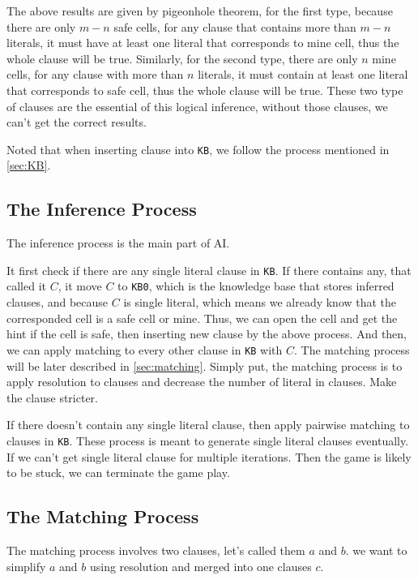 \documentclass[twocolumn]{extarticle}
\begin{document}
The above results are given by pigeonhole theorem, for the first type, because there are only $m-n$ safe cells, for any clause that contains more than $m-n$ literals, it must have at least one literal that corresponds to mine cell, thus the whole clause will be true. Similarly, for the second type, there are only $n$ mine cells, for any clause with more than $n$ literals, it must contain at least one literal that corresponds to safe cell, thus the whole clause will be true. These two type of clauses are the essential of this logical inference, without those clauses, we can't get the correct results.

Noted that when inserting clause into \texttt{KB}, we follow the process mentioned in \autoref{sec:KB}.

\subsection{The Inference Process}

The inference process is the main part of AI. 

It first check if there are any single literal clause in \texttt{KB}. If there contains any, that called it $C$, it move $C$ to \texttt{KB0}, which is the knowledge base that stores inferred clauses, and because $C$ is single literal, which means we already know that the corresponded cell is a safe cell or mine. Thus, we can open the cell and get the hint if the cell is safe, then inserting new clause by the above process. And then, we can apply matching to every other clause in \texttt{KB} with $C$. The matching process will be later described in \autoref{sec:matching}. Simply put, the matching process is to apply resolution to clauses and decrease the number of literal in clauses. Make the clause stricter.

If there doesn't contain any single literal clause, then apply pairwise matching to clauses in \texttt{KB}. These process is meant to generate single literal clauses eventually. If we can't get single literal clause for multiple iterations. Then the game is likely to be stuck, we can terminate the game play.

\subsection{The Matching Process \label{sec:matching}}

The matching process involves two clauses, let's called them $a$ and $b$. we want to simplify $a$ and $b$ using resolution and merged into one clauses $c$.
\end{document}
